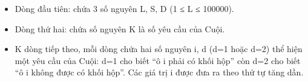 \begin{itemize}
	\item Dòng đầu tiên: chứa 3 số nguyên L, S, D (1 ≤ L ≤ 100000).
	\item Dòng thứ hai: chứa số nguyên K là số yêu cầu của Cuội.
	\item K dòng tiếp theo, mỗi dòng chứa hai số nguyên i, d (d=1 hoặc d=2) thể hiện một yêu cầu của Cuội: d=1 cho biết “ô i phải có khối hộp” còn d=2 cho biết “ô i không được có khối hộp”. Các giá trị i được đưa ra theo thứ tự tăng dần.
\end{itemize}